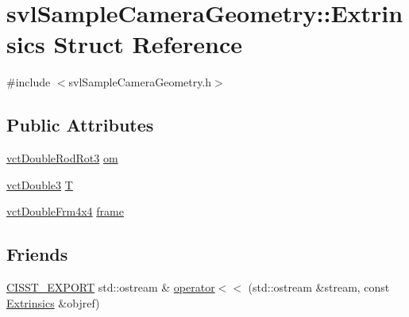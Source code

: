 \hypertarget{structsvl_sample_camera_geometry_1_1_extrinsics}{\section{svl\-Sample\-Camera\-Geometry\-:\-:Extrinsics Struct Reference}
\label{structsvl_sample_camera_geometry_1_1_extrinsics}
}


{\ttfamily \#include $<$svl\-Sample\-Camera\-Geometry.\-h$>$}

\subsection*{Public Attributes}
\begin{DoxyCompactItemize}
\item 
\hyperlink{vct_transformation_types_8h_a350d1047878839beb9dd36107516bd75}{vct\-Double\-Rod\-Rot3} \hyperlink{structsvl_sample_camera_geometry_1_1_extrinsics_abd8791bf9873b33112dba8c6fb055a62}{om}
\item 
\hyperlink{vct_fixed_size_vector_types_8h_a4a89122c9d7f72c3f31fe8126e17c3af}{vct\-Double3} \hyperlink{structsvl_sample_camera_geometry_1_1_extrinsics_aeeb68b4523c0230563b17f03bc7f5ebe}{T}
\item 
\hyperlink{vct_transformation_types_8h_ac7626dd8caf0095c4a1b427918c0f3b8}{vct\-Double\-Frm4x4} \hyperlink{structsvl_sample_camera_geometry_1_1_extrinsics_a9640da226d49f0f869ab02ab2636e760}{frame}
\end{DoxyCompactItemize}
\subsection*{Friends}
\begin{DoxyCompactItemize}
\item 
\hyperlink{cmn_export_macros_8h_a99393e0c3ac434b2605235bbe20684f8}{C\-I\-S\-S\-T\-\_\-\-E\-X\-P\-O\-R\-T} std\-::ostream \& \hyperlink{structsvl_sample_camera_geometry_1_1_extrinsics_afd73af7c4b4ded94b79da910e08e5351}{operator$<$$<$} (std\-::ostream \&stream, const \hyperlink{structsvl_sample_camera_geometry_1_1_extrinsics}{Extrinsics} \&objref)
\end{DoxyCompactItemize}


